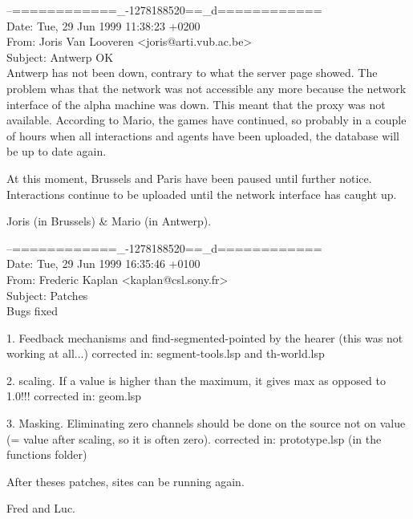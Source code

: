 \begin{mail}
--============\_-1278188520==\_d============\\
Date: Tue, 29 Jun 1999 11:38:23 +0200\\
From: Joris Van Looveren <joris@arti.vub.ac.be>\\
Subject: Antwerp OK\\

Antwerp has not been down, contrary to what the server page showed. The
problem whas that the network was not accessible any more because the
network interface of the alpha machine was down. This meant that the
proxy was not available. According to Mario, the games have continued,
so probably in a couple of hours when all interactions and agents have
been uploaded, the database will be up to date again. 

At this moment, Brussels and Paris have been paused until further
notice. Interactions continue to be uploaded until the network interface
has caught up.

Joris (in Brussels) \& Mario (in Antwerp).
\end{mail}

\begin{mail}
--============\_-1278188520==\_d============\\
Date: Tue, 29 Jun 1999 16:35:46 +0100\\
From: Frederic Kaplan <kaplan@csl.sony.fr>\\
Subject: Patches\\

Bugs fixed

1. Feedback mechanisms and find-segmented-pointed by the hearer (this
was not working at all...) corrected in: segment-tools.lsp and th-world.lsp

2. scaling. If a value is higher than the maximum, it gives max as opposed to
1.0!!! corrected in: geom.lsp

3. Masking. Eliminating zero channels should be done on the source not on
value (= value after scaling, so it is often zero). corrected in: 
prototype.lsp (in the functions folder)

After theses patches, sites can be running again.

Fred and Luc.
\end{mail}

